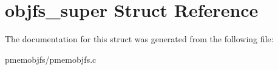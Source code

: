 \hypertarget{structobjfs__super}{}\section{objfs\+\_\+super Struct Reference}
\label{structobjfs__super}


The documentation for this struct was generated from the following file\+:\begin{DoxyCompactItemize}
\item 
pmemobjfs/pmemobjfs.\+c\end{DoxyCompactItemize}
